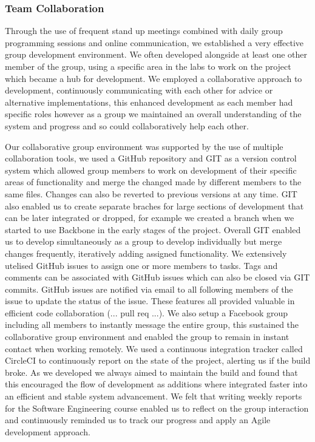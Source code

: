 \subsubsection{Team Collaboration}
Through the use of frequent stand up meetings combined with daily group programming sessions and online communication, we established a very effective group development environment. We often developed alongside at least one other member of the group, using a specific area in the labs to work on the project which became a hub for development. We employed a collaborative approach to development, continuously communicating with each other for advice or alternative implementations, this enhanced development as each member had specific roles however as a group we maintained an overall understanding of the system and progress and so could collaboratively help each other.

Our collaborative group environment was supported by the use of multiple collaboration tools, we used a GitHub repository and GIT as a version control system which allowed group members to work on development of their specific areas of functionality and merge the changed made by different members to the same files. Changes can also be reverted to previous versions at any time. GIT also enabled us to create separate braches for large sections of development that can be later integrated or dropped, for example we created a branch when we started to use Backbone in the early stages of the project. Overall GIT enabled us to develop simultaneously as a group to develop individually but merge changes frequently, iteratively adding assigned functionality. We extensively utelised GitHub issues to assign one or more members to tasks. Tags and comments can be associated with GitHub issues which can also be closed via GIT commits. GitHub issues are notified via email to all following members of the issue to update the status of the issue. These features all provided valuable in efficient code collaboration (... pull req ...). We also setup a Facebook group including all members to instantly message the entire group, this sustained the collaborative group environment and enabled the group to remain in instant contact when working remotely. 
We used a continuous integration tracker called CircleCI to continuously report on the state of the project, alerting us if the build broke. As we developed we always aimed to maintain the build and found that this encouraged the flow of development as additions where integrated faster into an efficient and stable system advancement.
We felt that writing weekly reports for the Software Engineering course enabled us to reflect on the group interaction and continuously reminded us to track our progress and apply an Agile development approach.   